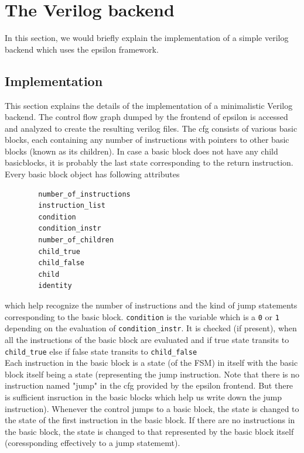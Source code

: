 \documentclass[titlepage]{article}
\begin{document}
    \section{The Verilog backend}

    In this section, we would briefly explain the implementation of a simple verilog backend which uses the epsilon framework.

    \subsection{Implementation}
        This section explains the details of the implementation of a minimalistic Verilog backend. The control flow graph dumped by the frontend of epsilon is accessed and analyzed to create the resulting verilog files. The cfg consists of various basic blocks, each containing any number of instructions with pointers to other basic blocks (known as its children). In case a basic block does not have any child basicblocks, it is probably the last state corresponding to the return instruction.
        Every basic block object has following attributes
        \begin{verbatim}        
        number_of_instructions
        instruction_list
        condition
        condition_instr
        number_of_children
        child_true
        child_false
        child
        identity\end{verbatim} which help recognize the number of instructions and the kind of jump statements corresponding to the basic block. \texttt{condition} is the variable which is a \texttt{0} or \texttt{1} depending on the evaluation of \texttt{condition\_instr}. It is checked (if present), when all the instructions of the basic block are evaluated and if true state transits to \texttt{child\_true} else if false state transits to \texttt{child\_false} \\Each instruction in the basic block is a state (of the FSM) in itself with the basic block itself being a state (representing the jump instruction. Note that there is no instruction named "jump" in the cfg provided by the epsilon frontend. But there is sufficient insruction in the basic blocks which help us write down the jump instruction). Whenever the control jumps to a basic block, the state is changed to the state of the first instruction in the basic block. If there are no instructions in the basic block, the state is changed to that represented by the basic block itself (coressponding effectively to a jump statememt). 
\end{document}
